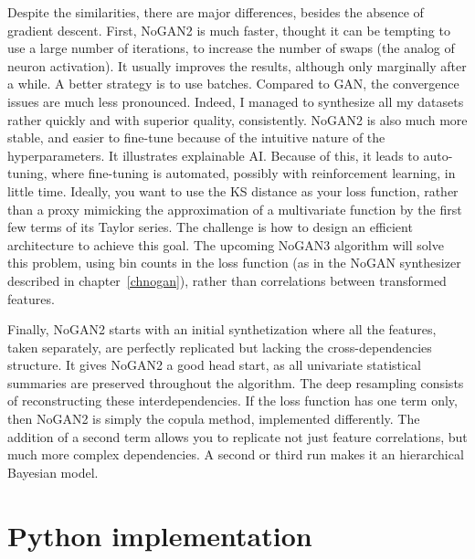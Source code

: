 \documentclass[oneside,10pt]{book}
\begin{document}
Despite the similarities, there are major differences, besides the absence of \textcolor{index}{gradient descent}. First, NoGAN2 is much faster, thought it can be tempting to use a large number of iterations, to increase the number of \textcolor{index}{swaps} (the analog of neuron \textcolor{index}{activation}). It usually improves the results, although only marginally after a while. A better strategy is to use batches. Compared to GAN, the convergence issues are much less pronounced. Indeed, I managed to synthesize all my datasets rather quickly and with superior quality, consistently. NoGAN2 is also much more stable, and easier to fine-tune because of the intuitive nature of the hyperparameters. It illustrates \textcolor{index}{explainable AI}. Because of this, it leads to 
\textcolor{index}{auto-tuning}, where fine-tuning is automated, possibly with \textcolor{index}{reinforcement learning}, in little time. Ideally, you want to use the KS distance as your loss function, rather than a proxy mimicking 
 the approximation of a multivariate function by the first few terms of its Taylor series. The challenge is how to design an efficient architecture to
 achieve this goal. The upcoming NoGAN3 algorithm will solve this problem, using bin counts in the loss function (as in the NoGAN synthesizer 
 described in chapter~\ref{chnogan}), rather than correlations between transformed features.

Finally, NoGAN2 starts with an initial synthetization where all the features, taken separately, are perfectly replicated but lacking the cross-dependencies structure. It gives NoGAN2 a good head start, as all univariate statistical summaries are preserved throughout the algorithm. The deep resampling consists of reconstructing these interdependencies. If the loss function has one term only, then NoGAN2 is simply the 
\textcolor{index}{copula method}, implemented differently. The addition of a second term allows you to replicate not just feature correlations, but much more complex dependencies. A second or third run makes it an \textcolor{index}{hierarchical Bayesian model}. 



\section{Python implementation}\label{pyityhohg}
\end{document}
